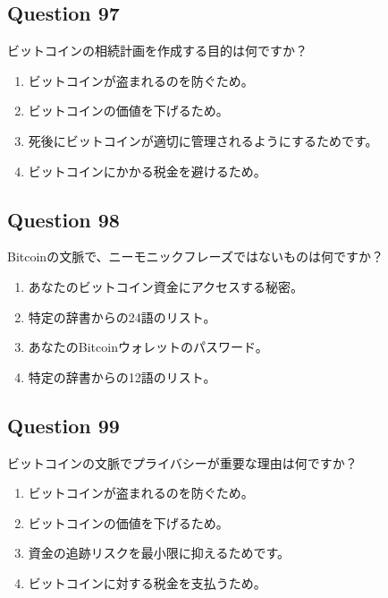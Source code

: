 \documentclass[12pt,a4paper]{article}
\begin{document}
\bigskip


\subsection*{Question 97}
ビットコインの相続計画を作成する目的は何ですか？

\begin{enumerate}[label=\Alph*., leftmargin=*]
\item ビットコインが盗まれるのを防ぐため。
\item ビットコインの価値を下げるため。
\item 死後にビットコインが適切に管理されるようにするためです。
\item ビットコインにかかる税金を避けるため。
\end{enumerate}

\bigskip


\subsection*{Question 98}
Bitcoinの文脈で、ニーモニックフレーズではないものは何ですか？

\begin{enumerate}[label=\Alph*., leftmargin=*]
\item あなたのビットコイン資金にアクセスする秘密。
\item 特定の辞書からの24語のリスト。
\item あなたのBitcoinウォレットのパスワード。
\item 特定の辞書からの12語のリスト。
\end{enumerate}

\bigskip


\subsection*{Question 99}
ビットコインの文脈でプライバシーが重要な理由は何ですか？

\begin{enumerate}[label=\Alph*., leftmargin=*]
\item ビットコインが盗まれるのを防ぐため。
\item ビットコインの価値を下げるため。
\item 資金の追跡リスクを最小限に抑えるためです。
\item ビットコインに対する税金を支払うため。
\end{enumerate}

\bigskip
\end{document}
